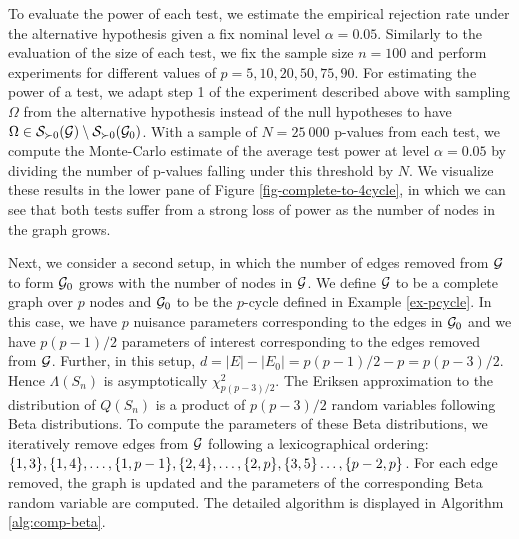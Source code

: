 To evaluate the power of each test, we estimate the empirical rejection rate under the alternative hypothesis given a fix nominal level $\alpha = 0.05$. Similarly to the evaluation of the size of each test, we fix the sample size $n = 100$ and perform experiments for different values of $p = 5, 10, 20, 50, 75, 90$. For estimating the power of a test, we adapt step 1 of the experiment described above with sampling $\Omega$ from the alternative hypothesis instead of the null hypotheses to have $\Omega \in {\mathcal{S}}_{\succ 0}({\mathcal{G}}) \setminus {\mathcal{S}}_{\succ 0}({\mathcal{G}}_0)$. With a sample of $N = 25\ 000$ p-values from each test, we compute the Monte-Carlo estimate of the average test power at level $\alpha = 0.05$ by dividing the number of p-values falling under this threshold by $N$. We visualize these results in the lower pane of Figure \ref{fig-complete-to-4cycle}, in which we can see that both tests suffer from a strong loss of power as the number of nodes in the graph grows.


Next, we consider a second setup, in which the number of edges removed from ${\mathcal{G}}$ to form ${\mathcal{G}}_0$ grows with the number of nodes in ${\mathcal{G}}$. We define ${\mathcal{G}}$ to be a complete graph over $p$ nodes and ${\mathcal{G}}_0$ to be the $p$-cycle defined in Example \ref{ex-pcycle}. In this case, we have $p$ nuisance parameters corresponding to the edges in ${\mathcal{G}}_0$ and we have $p(p-1)/2$ parameters of interest corresponding to the edges removed from ${\mathcal{G}}$. Further, in this setup, $d = |E| - |E_0| = p(p-1)/2 - p = p(p-3)/2$. Hence $\Lambda(S_n)$ is asymptotically $\chi^2_{p(p-3)/2}$. The Eriksen approximation to the distribution of $Q(S_n)$ is a product of $p(p-3)/2$ random variables following Beta distributions. To compute the parameters of these Beta distributions, we iteratively remove edges from ${\mathcal{G}}$ following a lexicographical ordering: ${\left\{1, 3\right\}}, {\left\{1, 4\right\}}, \ldots, {\left\{1, p-1\right\}}, {\left\{2, 4\right\}}, \ldots, {\left\{2, p\right\}}, {\left\{3, 5\right\}} \ldots, {\left\{p-2, p\right\}}$. For each edge removed, the graph is updated and the parameters of the corresponding Beta random variable are computed. The detailed algorithm is displayed in Algorithm \ref{alg:comp-beta}.

